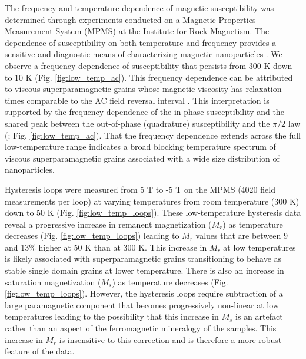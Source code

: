 \documentclass[draft]{agujournal2019}
\begin{document}
The frequency and temperature dependence of magnetic susceptibility was determined through experiments conducted on a Magnetic Properties Measurement System (MPMS) at the Institute for Rock Magnetism. The dependence of susceptibility on both temperature and frequency provides a sensitive and diagnostic means of characterizing magnetic nanoparticles \cite{Worm1999a}. We observe a frequency dependence of susceptibility that persists from 300 K down to 10 K (Fig. \ref{fig:low_temp_ac}). This frequency dependence can be attributed to viscous superparamagnetic grains whose magnetic viscosity has relaxation times comparable to the AC field reversal interval \cite{Worm1998a, Worm1999a}. This interpretation is supported by the frequency dependence of the in-phase susceptibility and the shared peak between the out-of-phase (quadrature) susceptibility and the $\pi/2$ law (\cite{Mullins1973a}; Fig. \ref{fig:low_temp_ac}). That the frequency dependence extends across the full low-temperature range indicates a broad blocking temperature spectrum of viscous superparamagnetic grains associated with a wide size distribution of nanoparticles. 

Hysteresis loops were measured from 5 T to -5 T on the MPMS (4020 field measurements per loop) at varying temperatures from room temperature (300 K) down to 50 K (Fig. \ref{fig:low_temp_loops}). These low-temperature hysteresis data reveal a progressive increase in remanent magnetization ($M_r$) as temperature decreases (Fig. \ref{fig:low_temp_loops}) leading to $M_r$ values that are between 9 and 13$\%$ higher at 50 K than at 300 K. This increase in $M_r$ at low temperatures is likely associated with superparamagnetic grains transitioning to behave as stable single domain grains at lower temperature. There is also an increase in saturation magnetization ($M_s$) as temperature decreases (Fig. \ref{fig:low_temp_loops}). However, the hysteresis loops require subtraction of a large paramagnetic component that becomes progressively non-linear at low temperatures leading to the possibility that this increase in $M_s$ is an artefact rather than an aspect of the ferromagnetic mineralogy of the samples. This increase in $M_r$ is insensitive to this correction and is therefore a more robust feature of the data. 
\end{document}
